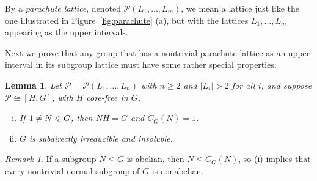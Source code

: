 \documentclass[11pt]{amsart}
\theoremstyle{plain}
\newtheorem{lemma}[theorem]{Lemma}
\theoremstyle{definition}
\theoremstyle{remark}
\newtheorem*{remark}{Remark}
\numberwithin{theorem}{section}
\numberwithin{claim}{section}
\numberwithin{equation}{section}
\numberwithin{conjecture}{section}
\newcommand{\<}{\ensuremath{\langle}}
\renewcommand{\>}{\ensuremath{\rangle}}
\renewcommand{\leq}{\ensuremath{\leqslant}}
\renewcommand{\geq}{\ensuremath{\geqslant}}
\newcommand{\subnormal}{\ensuremath{\trianglelefteqslant}}
\newcommand{\0}{\ensuremath{\mathbf{0}}}
\newcommand{\1}{\ensuremath{\mathbf{1}}}
\newcommand{\2}{\ensuremath{\mathbf{2}}}
\newcommand{\3}{\ensuremath{\mathbf{3}}}
\newcommand{\4}{\ensuremath{\mathbf{4}}}
\newcommand{\5}{\ensuremath{\mathbf{5}}}
\newcommand{\sP}{\ensuremath{\mathscr{P}}}
\begin{document}
By a \emph{parachute lattice}, denoted $\sP(L_1, \dots, L_m)$,
we mean a lattice just like the one illustrated in 
Figure~\ref{fig:parachute} (a), but with the lattices $L_1, \dots, L_m$
appearing as the upper intervals. %

Next we prove that %
any group that has a nontrivial parachute lattice as an upper interval
in its subgroup lattice must have some rather special properties.  
\begin{lemma}
\label{lemma-wjd-5}
 Let $\sP = \sP(L_1, \dots, L_n)$ with $n\geq 2$ and $|L_i|>2$ for all
$i$, and suppose $\sP \cong [H, G]$, with $H$ core-free in $G$.  
\begin{enumerate}[(i)]
\item If $1\neq N \subnormal G$, then $NH = G$ and $C_G(N)=1$.
\item $G$ is subdirectly irreducible and insoluble.
\end{enumerate}
\end{lemma}
\begin{remark}
If a subgroup $N\leq G$ is abelian, then $N \leq C_G(N)$, so (i) implies
that every nontrivial normal subgroup of $G$ is nonabelian.  
\end{remark}
\end{document}
